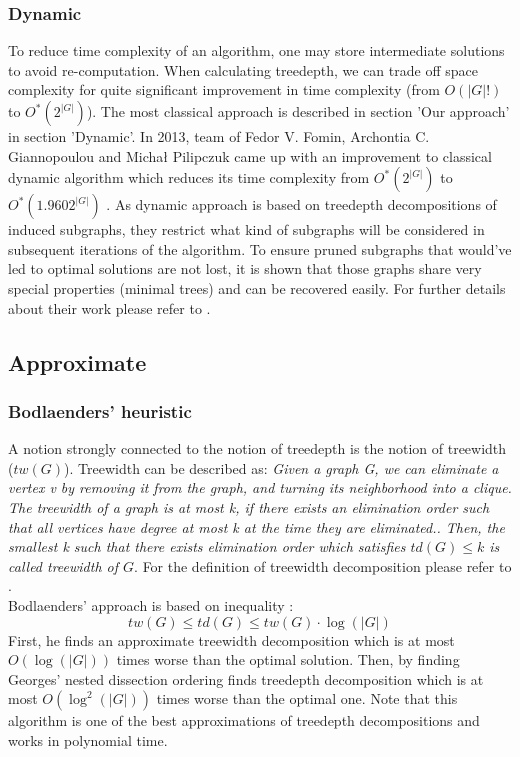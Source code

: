 \subsubsection{Dynamic}
To reduce time complexity of an algorithm, one may store intermediate solutions to avoid re-computation. When calculating treedepth, we can trade off space complexity for quite significant improvement in time complexity (from $O\left(\left|G\right|!\right)$ to $O^{*}\left(2^{\left|G\right|}\right)$). The most classical approach is described in section 'Our approach' in section 'Dynamic'. In 2013, team of Fedor V. Fomin, Archontia C. Giannopoulou and Michał Pilipczuk came up with an improvement to classical dynamic algorithm which reduces its time complexity from $O^{*}\left(2^{\left|G\right|}\right)$ to $O^{*}\left(1.9602^{\left|G\right|}\right)$ \cite{mimuw_td}. As dynamic approach is based on treedepth decompositions of induced subgraphs, they restrict what kind of subgraphs will be considered in subsequent iterations of the algorithm. To ensure pruned subgraphs that would've led to optimal solutions are not lost, it is shown that those graphs share very special properties (minimal trees) and can be recovered easily. For further details about their work please refer to \cite{mimuw_td}.
\newpage
\subsection{Approximate}
\subsubsection{Bodlaenders' heuristic \cite{bodlaender_td_approx}}
A notion strongly connected to the notion of treedepth is the notion of treewidth ($tw\left(G\right)$). Treewidth can be described as:
\emph{Given a graph G, we can eliminate a vertex v by removing it from the graph, and turning its neighborhood into a clique. The treewidth of a graph is at most k, if there exists an elimination order such that all vertices have degree at most k at the time they are eliminated.\cite{tw_gpu}. Then, the smallest k such that there exists elimination order which satisfies $td(G)\leq k$ is called treewidth of $G$}. For the definition of treewidth decomposition please refer to \cite{tw_decomp}.\\
Bodlaenders' approach is based on inequality \cite{mimuw_td}\cite{bodlaender_td_approx}:
\begin{equation}
tw(G) \leq td(G) \leq tw(G)\cdot \log\left(\left|G\right|\right)
\end{equation}
First, he finds an approximate treewidth decomposition which is at most $O\left(\log\left(\left|G\right|\right)\right)$ times worse than the optimal solution.
Then, by finding Georges' nested dissection ordering \cite{george}\cite{bodlaender_td_approx} finds treedepth decomposition which is at most $O\left(\log^2\left(\left|G\right|\right)\right)$ times worse than the optimal one. Note that this algorithm is one of the best approximations of treedepth decompositions and works in polynomial time.
